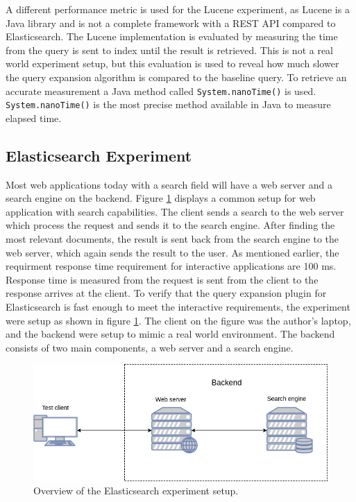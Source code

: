 A different performance metric is used for the Lucene experiment,
as Lucene is a Java library and is not a complete framework with a REST API compared to Elasticsearch.
The Lucene implementation is evaluated by measuring the time from the query is sent to index until the result is retrieved.
This is not a real world experiment setup,
but this evaluation is used to reveal how much slower the query expansion algorithm is compared to the baseline query.
To retrieve an accurate measurement a Java method called \texttt{System.nanoTime()} is used.
\texttt{System.nanoTime()} is the most precise method available in Java to measure elapsed time.

\subsection{Elasticsearch Experiment}
Most web applications today with a search field will have a web server and a search engine on the backend.
Figure \ref{fig:elasticsearch-experiment-setup} displays a common setup for web application with search capabilities.
The client sends a search to the web server which process the request and sends it to the search engine.
After finding the most relevant documents, the result is sent back from the search engine to the web server,
which again sends the result to the user.
As mentioned earlier,
the requirment response time requirement for interactive applications are 100 ms.
Response time is measured from the request is sent from the client to the response arrives at the client.
To verify that the query expansion plugin for Elasticsearch is fast enough to meet the interactive requirements,
the experiment were setup as shown in figure \ref{fig:elasticsearch-experiment-setup}.
The client on the figure was the author's laptop,
and the backend were setup to mimic a real world environment.
The backend consists of two main components, a web server and a search engine.

\begin{figure}[h!]
  \centering \includegraphics[width=0.9\linewidth]{img/elasticsearch-experiment-setup.png}
  \caption{Overview of the Elasticsearch experiment setup.}
  \label{fig:elasticsearch-experiment-setup}
\end{figure}

